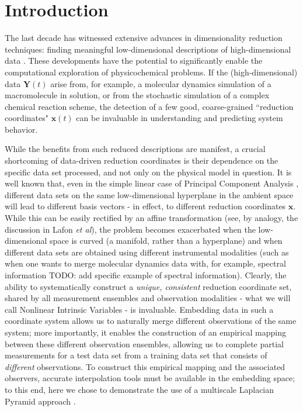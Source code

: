 \documentclass[aip,jcp,preprint]{revtex4-1}
\begin{document}

\maketitle

\section{Introduction}
The last decade has witnessed extensive advances in dimensionality reduction techniques:
finding meaningful low-dimensional descriptions of high-dimensional data \cite{Tenenbaum2000,Roweis2000,Donoho2003,Belkin2003,Coifman2006}.
%
These developments have the potential to significantly enable the computational exploration
of physicochemical problems.
%
If the (high-dimensional) data $\mathbf{Y}(t)$ arise from, for example, a
molecular dynamics simulation of a macromolecule in solution, or from the stochastic
simulation of a complex chemical reaction scheme, the detection of a few good, coarse-grained
``reduction coordinates" $\mathbf{x}(t)$ can be invaluable in understanding and predicting system behavior.

While the benefits from such reduced descriptions are manifest, a crucial shortcoming of
 data-driven reduction coordinates is their dependence on the specific data set processed,
and not only on the physical model in question.
%
It is well known that, even in the simple linear case of Principal Component Analysis \cite{jolliffe2005principal},
different data sets on the same low-dimensional hyperplane in the ambient space
will lead to different basis vectors - in effect, to different reduction coordinates $\mathbf{x}$.
%
While this can be easily rectified by an affine transformation
(see, by analogy, the discussion in Lafon {\em et al}\cite{lafon2006data}),
the problem becomes
exacerbated when the low-dimensional space is curved (a manifold, rather than a hyperplane)
and when different data sets are obtained using different instrumental modalities
(such as when one wants to merge molecular dynamics data with, for example, spectral information {\color{red} TODO: add specific example of spectral information}).
%
Clearly, the ability to systematically construct a {\em unique, consistent} reduction
coordinate set, shared by all measurement ensembles and observation modalities -
what we will call Nonlinear Intrinsic Variables - is invaluable.
%
Embedding data in such a coordinate system allows us to naturally merge different observations of the same system;
more importantly, it enables the construction of an empirical mapping between these different
observation ensembles, allowing us to complete partial measurements for a test data set from a training data set 
that consists of {\em different} observations.
%
To construct this empirical mapping and the associated observers,
accurate interpolation tools must be available in the embedding space; to this
end, here we chose to demonstrate the use of a multiscale Laplacian Pyramid approach \cite{rabin2012heterogeneous}.
\end{document}
